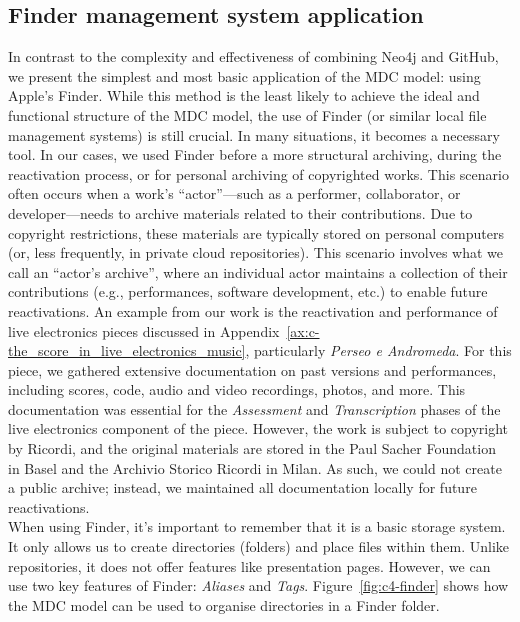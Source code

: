 \subsection{Finder management system application}
In contrast to the complexity and effectiveness of combining Neo4j and GitHub, we present the simplest and most basic application of the MDC model: using Apple’s Finder. While this method is the least likely to achieve the ideal and functional structure of the MDC model, the use of Finder (or similar local file management systems) is still crucial. In many situations, it becomes a necessary tool. In our cases, we used Finder before a more structural archiving, during the reactivation process, or for personal archiving of copyrighted works. This scenario often occurs when a work’s ``actor''—such as a performer, collaborator, or developer—needs to archive materials related to their contributions. Due to copyright restrictions, these materials are typically stored on personal computers (or, less frequently, in private cloud repositories). This scenario involves what we call an ``actor’s archive'', where an individual actor maintains a collection of their contributions (e.g., performances, software development, etc.) to enable future reactivations. An example from our work is the reactivation and performance of live electronics pieces discussed in Appendix~\ref{ax:c-the_score_in_live_electronics_music}, particularly \textit{Perseo e Andromeda}. For this piece, we gathered extensive documentation on past versions and performances, including scores, code, audio and video recordings, photos, and more. This documentation was essential for the \textit{Assessment} and \textit{Transcription} phases of the live electronics component of the piece. However, the work is subject to copyright by Ricordi, and the original materials are stored in the Paul Sacher Foundation in Basel and the Archivio Storico Ricordi in Milan. As such, we could not create a public archive; instead, we maintained all documentation locally for future reactivations.\\
When using Finder, it’s important to remember that it is a basic storage system. It only allows us to create directories (folders) and place files within them. Unlike repositories, it does not offer features like presentation pages. However, we can use two key features of Finder: \textit{Aliases} and \textit{Tags}. Figure~\ref{fig:c4-finder} shows how the MDC model can be used to organise directories in a Finder folder.

